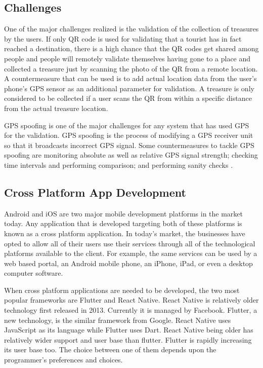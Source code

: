 \documentclass[12pt, a4paper, oneside]{article}
\begin{document}
\subsection{Challenges}
One of the major challenges realized is the validation of the collection of treasures by the users. If only QR code is used for validating that a tourist has in fact reached a destination, there is a high chance that the QR codes get shared among people and people will remotely validate themselves having gone to a place and collected a treasure just by scanning the photo of the QR from a remote location. A countermeasure that can be used is to add actual location data from the user's phone's GPS sensor as an additional parameter for validation. A treasure is only considered to be collected if a user scans the QR from within a specific distance from the actual treasure location.

GPS spoofing is one of the major challenges for any system that has used GPS for the validation. GPS spoofing is the process of modifying a GPS receiver unit so that it broadcasts incorrect GPS signal. Some countermeasures to tackle GPS spoofing are monitoring absolute as well as relative GPS signal strength; checking time intervals and performing comparison; and performing sanity checks \cite{gpsspoofmeasures}.

\subsection{Cross Platform App Development}
Android and iOS are two major mobile development platforms in the market today. Any application that is developed targeting both of these platforms is known as a cross platform application. In today's market, the businesses have opted to allow all of their users use their services through all of the technological platforms available to the client. For example, the same services can be used by a web based portal, an Android mobile phone, an iPhone, iPad, or even a desktop computer software.

When cross platform applications are needed to be developed, the two most popular frameworks are Flutter and React Native. React Native is relatively older technology first released in 2013. Currently it is managed by Facebook. Flutter, a new technology, is the similar framework from Google. React Native uses JavaScript as its language while Flutter uses Dart. React Native being older has relatively wider support and user base than flutter. Flutter is rapidly increasing its user base too. The choice between one of them depends upon the programmer's preferences and choices.
\end{document}
